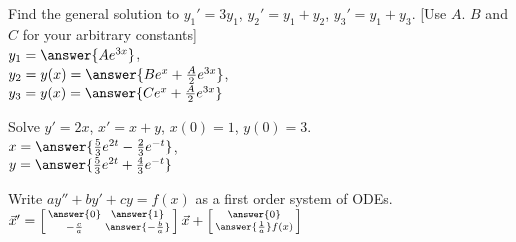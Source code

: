 \documentclass{ximera}
\begin{document}
\begin{exercise}%
    Find the general solution to $y_1' = 3 y_1$, $y_2' = y_1 + y_2$, $y_3' = y_1 + y_3$. [Use $A$. $B$ and $C$ for your arbitrary constants]\\
    $y_1 = \answer{A e^{3x}}$,\\
    $y_2 = y(x) = \answer{B e^x+ \frac{A}{2} e^{3 x}}$,\\
    $y_3 = y(x) = \answer{C e^x+ \frac{A}{2} e^{3 x}}$
\end{exercise}

\begin{exercise}%
    Solve $y'=2x$, $x'=x+y$, $x(0)=1$, $y(0)=3$.\\
    $x = \answer{\frac{5}{3} e^{2t} - \frac{2}{3} e^{-t}}$,\\
    $y = \answer{\frac{5}{3} e^{2t} + \frac{4}{3} e^{-t}}$
\end{exercise}


\begin{exercise}
    Write $ay'' + by' + cy = f(x)$ as a first order system of ODEs.\\
    $\vec{x} ' = \left[\begin{smallmatrix} \answer{0} & \answer{1} \\ -\frac{c}{a} & \answer{-\frac{b}{a}} \end{smallmatrix}\right] \vec{x} + \left[\begin{smallmatrix}  \answer{0} \\ \answer{\frac{1}{a}}f(x) \end{smallmatrix}\right]$
\end{exercise}
\end{document}
